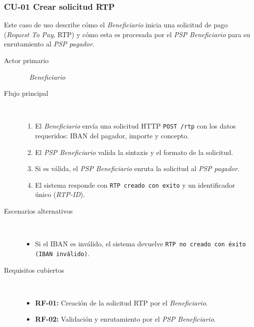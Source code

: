 \subsubsection{CU-01 Crear solicitud RTP}
Este caso de uso describe cómo el \textit{Beneficiario} inicia una solicitud de pago (\textit{Request To Pay}, RTP) y cómo esta es procesada por el \textit{PSP Beneficiario} para su enrutamiento al \textit{PSP pagador}.
\begin{description}
  \item[Actor primario] ~ \textit{Beneficiario}
  \item[Flujo principal] ~
    \begin{enumerate}
      \item El \textit{Beneficiario} envía una solicitud HTTP \texttt{POST /rtp} con los datos requeridos: IBAN del pagador, importe y concepto.
      \item El \textit{PSP Beneficiario} valida la sintaxis y el formato de la solicitud.
      \item Si es válida, el \textit{PSP Beneficiario} enruta la solicitud al \textit{PSP pagador}.
      \item El sistema responde con \texttt{RTP creado con exito} y un identificador único (\textit{RTP-ID}).
    \end{enumerate}
  \item[Escenarios alternativos] ~
    \begin{itemize}
      \item Si el IBAN es inválido, el sistema devuelve \texttt{RTP no creado con éxito (IBAN inválido)}.
    \end{itemize}
  \item[Requisitos cubiertos] ~
    \begin{itemize}
      \item \textbf{RF-01:} Creación de la solicitud RTP por el \textit{Beneficiario}.
      \item \textbf{RF-02:} Validación y enrutamiento por el \textit{PSP Beneficiario}.
    \end{itemize}
\end{description}

